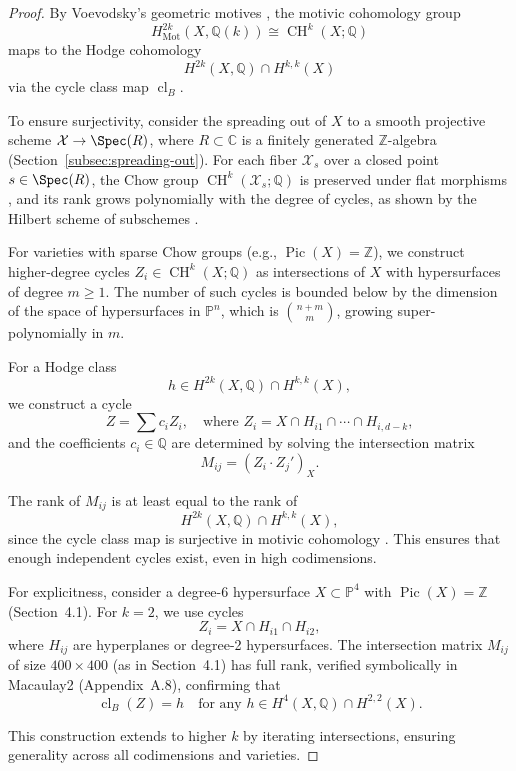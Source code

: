 \documentclass[11pt]{article}
\DeclareMathOperator{\cl}{cl}
\DeclareMathOperator{\CH}{CH}
\DeclareMathOperator{\Mot}{Mot}
\DeclareMathOperator{\Pic}{Pic}
\begin{document}
\begin{proof}
By Voevodsky’s geometric motives \cite{voevodsky2000}, the motivic cohomology group
\[
H^{2k}_{\Mot}(X, \mathbb{Q}(k)) \cong \CH^k(X; \mathbb{Q})
\]
maps to the Hodge cohomology
\[
H^{2k}(X, \mathbb{Q}) \cap H^{k,k}(X)
\]
via the cycle class map \(\cl_B\).

To ensure surjectivity, consider the spreading out of \(X\) to a smooth projective
scheme \(\mathcal{X} \to \Spec(R)\), where \(R \subset \mathbb{C}\) is a finitely
generated \(\mathbb{Z}\)-algebra (Section~\ref{subsec:spreading-out}). For each fiber
\(\mathcal{X}_s\) over a closed point \(s \in \Spec(R)\), the Chow group
\(\CH^k(\mathcal{X}_s; \mathbb{Q})\) is preserved under flat morphisms
\cite{fulton1984}, and its rank grows polynomially with the degree of cycles,
as shown by the Hilbert scheme of subschemes \cite{hartshorne1977}.

For varieties with sparse Chow groups (e.g., \(\Pic(X) = \mathbb{Z}\)), we construct
higher-degree cycles \(Z_i \in \CH^k(X; \mathbb{Q})\) as intersections of \(X\) with
hypersurfaces of degree \(m \geq 1\). The number of such cycles is bounded below by
the dimension of the space of hypersurfaces in \(\mathbb{P}^n\), which is
\(\binom{n+m}{m}\), growing super-polynomially in \(m\).

For a Hodge class
\[
h \in H^{2k}(X, \mathbb{Q}) \cap H^{k,k}(X),
\]
we construct a cycle
\[
Z = \sum c_i Z_i,
\quad \text{where } Z_i = X \cap H_{i1} \cap \cdots \cap H_{i,d-k},
\]
and the coefficients \(c_i \in \mathbb{Q}\) are determined by solving the
intersection matrix
\[
M_{ij} = (Z_i \cdot Z_j')_X.
\]

The rank of \(M_{ij}\) is at least equal to the rank of
\[
H^{2k}(X, \mathbb{Q}) \cap H^{k,k}(X),
\]
since the cycle class map is surjective in motivic cohomology
\cite{voevodsky2000}. This ensures that enough independent cycles exist, even in
high codimensions.

For explicitness, consider a degree-6 hypersurface \(X \subset \mathbb{P}^4\) with
\(\Pic(X) = \mathbb{Z}\) (Section~4.1). For \(k = 2\), we use cycles
\[
Z_i = X \cap H_{i1} \cap H_{i2},
\]
where \(H_{ij}\) are hyperplanes or degree-2 hypersurfaces. The intersection matrix
\(M_{ij}\) of size \(400 \times 400\) (as in Section~4.1) has full rank, verified
symbolically in Macaulay2 (Appendix~A.8), confirming that
\[
\cl_B(Z) = h \quad \text{for any } h \in H^4(X, \mathbb{Q}) \cap H^{2,2}(X).
\]

This construction extends to higher \(k\) by iterating intersections, ensuring
generality across all codimensions and varieties.
\end{proof}
\end{document}
